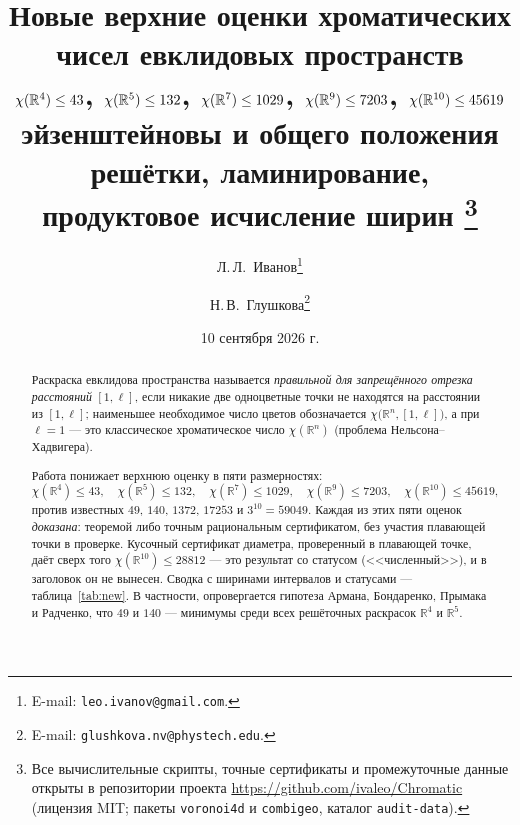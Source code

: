 \documentclass[11pt]{article}
\title{\bfseries Новые верхние оценки хроматических чисел
евклидовых пространств\\[2pt]
\large $\chi(\R^4)\le43$,\; $\chi(\R^5)\le132$,\; $\chi(\R^7)\le1029$,\;
$\chi(\R^9)\le7203$,\; $\chi(\R^{10})\le45619$\\[4pt]
\normalsize\mdseries эйзенштейновы и общего положения решётки,
ламинирование, продуктовое исчисление ширин%
\thanks{Все вычислительные скрипты, точные сертификаты и промежуточные данные
открыты в репозитории проекта \url{https://github.com/ivaleo/Chromatic}
(лицензия MIT; пакеты \texttt{voronoi4d} и \texttt{combigeo}, каталог
\texttt{audit-data}).}}
\author{Л.\,Л.~Иванов\thanks{E-mail: \texttt{leo.ivanov@gmail.com}.}
  \and Н.\,В.~Глушкова\thanks{E-mail: \texttt{glushkova.nv@phystech.edu}.}}
\date{10 сентября 2026 г.}
\theoremstyle{definition}
\theoremstyle{remark}
\newcommand{\R}{\mathbb{R}}
\newcommand{\cyrbadge}[1]{{\fontencoding{T2A}\selectfont #1}}
\newcommand{\stN}{\textcolor{BurntOrange}{\textbf{\cyrbadge{[Ч]}}}}     %
\begin{document}
\maketitle


\begin{abstract}
\noindent
Раскраска евклидова пространства называется \emph{правильной для запрещённого
отрезка расстояний} $[1,\ell]$, если никакие две одноцветные точки не находятся
на расстоянии из $[1,\ell]$; наименьшее необходимое число цветов обозначается
$\chi\bigl(\R^n,[1,\ell]\bigr)$, а при $\ell=1$ --- это классическое
хроматическое число $\chi(\R^n)$ (проблема Нельсона--Хадвигера).

Работа понижает верхнюю оценку в пяти размерностях:
\[
\chi(\R^4)\le43,\quad \chi(\R^5)\le132,\quad \chi(\R^7)\le1029,\quad
\chi(\R^9)\le7203,\quad \chi(\R^{10})\le45619,
\]
против известных $49$, $140$, $1372$, $17253$ и $3^{10}=59049$. Каждая из этих
пяти оценок \emph{доказана}: теоремой либо точным рациональным сертификатом,
без участия плавающей точки в проверке. Кусочный сертификат диаметра,
проверенный в плавающей точке, даёт сверх того $\chi(\R^{10})\le28812$ ---
это результат со статусом \stN{} (<<численный>>), и в заголовок он не
вынесен. Сводка с ширинами
интервалов и статусами --- таблица~\ref{tab:new}. В частности,
опровергается гипотеза Армана, Бондаренко, Прымака и Радченко, что $49$ и $140$
--- минимумы среди всех решёточных раскрасок $\R^4$ и $\R^5$.


\end{abstract}
\end{document}
